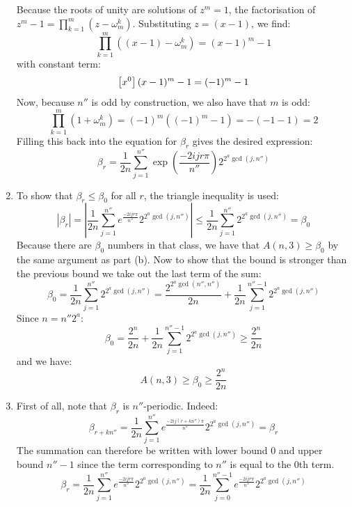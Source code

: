 \begin{solution}
\begin{enumerate}[label=(\alph*)]
        Because the roots of unity are solutions of $z^m = 1$, the factorisation of $z^m - 1 = \prod_{k=1}^m (z - \omega_m^k)$. Substituting $z = (x-1)$, we find:
        \[
            \prod_{k=1}^{m} ((x-1)-\omega_m^k) = (x-1)^m - 1
        \]
        with constant term:
        \[
            \left[x^0\right] (x-1)^m - 1 = (-1)^m - 1
        \]
        Now, because $n''$ is odd by construction, we also have that $m$ is odd:
        \[
            \prod_{k=1}^m (1 + \omega_m^k) = (-1)^m((-1)^m - 1) = -(-1 - 1) = 2
        \]
        Filling this back into the equation for $\beta_r$ gives the desired expression:
        \[
            \beta_r = \frac{1}{2n} \sum_{j=1}^{n''} \exp\left(\frac{-2ijr\pi}{n''}\right) 2^{2^a \gcd(j,n'')}
        \]
        \item To show that $\beta_r \leq \beta_0$ for all $r$, the triangle inequality is used:
        \[
            |\beta_r| = \left|\frac{1}{2n} \sum_{j=1}^{n''}e^{\frac{-2ijr\pi}{n''}} 2^{2^a \gcd(j,n'')}\right| 
            \leq \frac{1}{2n} \sum_{j=1}^{n''} 2^{2^a \gcd(j,n'')} = \beta_0
        \]
        Because there are $\beta_0$ numbers in that class, we have that $A(n,3) \geq \beta_0$ by the same argument as part (b). Now to show that the bound is stronger than the previous bound we take out the last term of the sum:
        \[
            \beta_0 =  \frac{1}{2n} \sum_{j=1}^{n''} 2^{2^a \gcd(j,n'')} = \frac{2^{2^a\gcd(n'',n'')}}{2n} + \frac{1}{2n}   \sum_{j=1}^{n''-1}2^{2^a \gcd(j,n'')}
        \]
        Since $n=n''2^a$:
        \[
            \beta_0 = \frac{2^n}{2n} +\frac{1}{2n}   \sum_{j=1}^{n''-1}2^{2^a \gcd(j,n'')} \geq \frac{2^n}{2n} 
        \] and we have:
        \[
            A(n,3) \geq \beta_0 \geq \frac{2^n}{2n}
        \]
        \item First of all, note that $\beta_r$ is $n''$-periodic. Indeed:
        \[
            \beta_{r + kn''} = \frac{1}{2n}\sum_{j=1}^{n''}e^{\frac{-2ij(r+kn'')\pi}{n''}} 2^{2^a \gcd(j,n'')}  = \beta_r
        \]
        The summation can therefore be written with lower bound $0$ and upper bound $n''-1$ since the term corresponding to $n''$ is equal to the $0$th term.
        \[
            \beta_r = \frac{1}{2n}\sum_{j=1}^{n''}e^{\frac{-2ijr\pi}{n''}} 2^{2^a \gcd(j,n'')} = \frac{1}{2n}\sum_{j=0}^{n''-1}e^{\frac{-2ijr\pi}{n''}} 2^{2^a \gcd(j,n'')}
        \]


\end{enumerate}
\end{solution}
